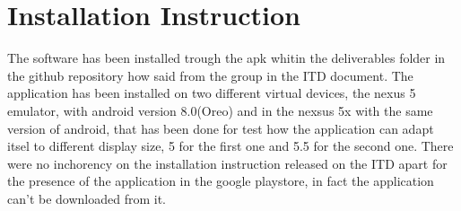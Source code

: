 \chapter{Installation Instruction}
The software has been installed trough the apk whitin the deliverables folder in the github repository how said from the group in the ITD document. The application has been installed on two different virtual devices, the nexus 5 emulator, with android version 8.0(Oreo) and in the nexsus 5x with the same version of android, that has been done for test how the application can adapt itsel to different display size, 5 for the first one and 5.5 for the second one. There were no inchorency on the installation instruction released on the ITD apart for the presence of the application in the google playstore, in fact the application can't be downloaded from it.